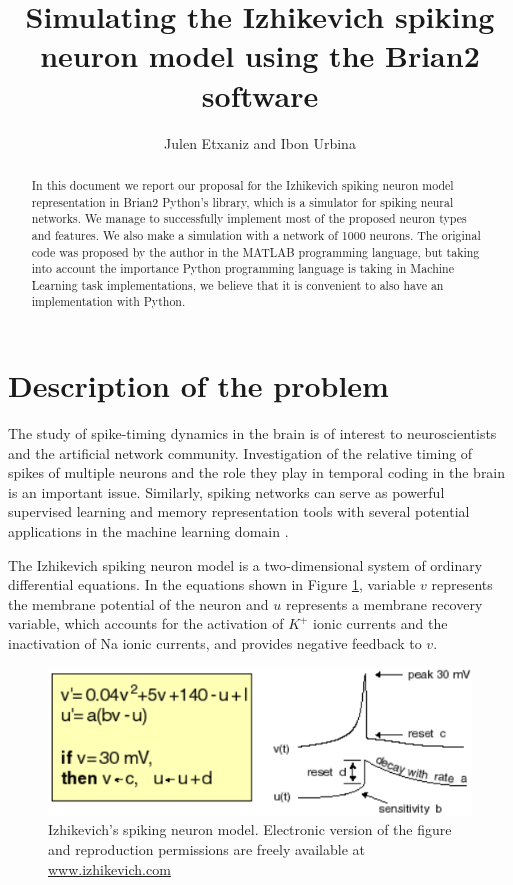 \documentclass{article} %
\title{Simulating the Izhikevich spiking neuron model using
the Brian2 software}
\author{Julen Etxaniz and Ibon Urbina}
\begin{document}
\maketitle

\begin{abstract}
In this document we report our proposal for the Izhikevich spiking neuron model representation in Brian2 Python's library, which is a simulator for spiking neural networks. We manage to successfully implement most of the proposed neuron types and features. We also make a simulation with a network of 1000 neurons. The original code was proposed by the author in the MATLAB programming language, but taking into account the importance Python programming language is taking in Machine Learning task implementations, we believe that it is convenient to also have an implementation with Python.
\end{abstract}

\tableofcontents

\section{Description of the problem}


The study of spike-timing dynamics in the brain is of interest to neuroscientists and the artificial network community. Investigation of the relative timing of spikes of multiple neurons \cite{Izhikevich2008LargescaleMO} and the role they play in temporal coding in the brain is an important issue. Similarly, spiking networks can serve as powerful supervised learning and memory representation tools with several potential applications in the machine learning domain \cite{PaugamMoisy2008DelayLA}.

The Izhikevich spiking neuron model \cite{Izhikevich2003Simple} \cite{Izhikevich2004Which} is a two-dimensional system of ordinary differential equations. In the equations shown in Figure \ref{fig:model}, variable \(v\) represents the membrane potential of the neuron and \(u\) represents a membrane recovery variable, which accounts for the activation of \(K^+\) ionic currents and the inactivation of Na ionic currents, and provides negative feedback to \(v\).

\begin{figure}[ht]
    \centering
    \includegraphics{model.png}
    \caption{Izhikevich’s spiking neuron model. Electronic version of the figure and reproduction permissions are freely available at \url{www.izhikevich.com}}
    \label{fig:model}
\end{figure}
\end{document}
